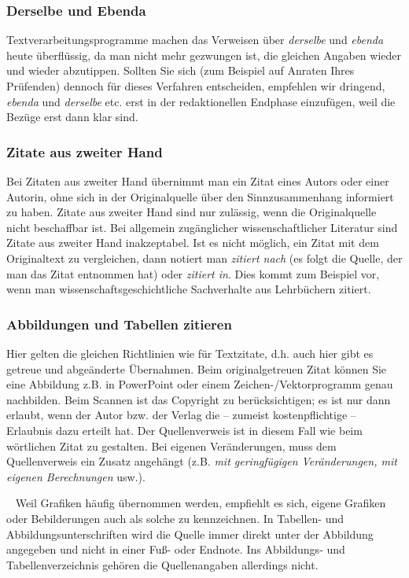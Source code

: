 \documentclass[a4paper,11pt]{article}%
\renewcommand{\\}{\vspace*{0.5\baselineskip} \newline}
\begin{document}
\subsubsection{Derselbe und Ebenda}
Textverarbeitungsprogramme machen das Verweisen über \textit{derselbe} und \textit{ebenda} heute überflüssig, da man nicht mehr gezwungen ist, die gleichen Angaben wieder und wieder abzutippen. Sollten Sie sich (zum Beispiel auf Anraten Ihres Prüfenden) dennoch für dieses Verfahren entscheiden, empfehlen wir dringend, \textit{ebenda} und \textit{derselbe} etc. erst in der redaktionellen Endphase einzufügen, weil die Bezüge erst dann klar sind. 

\subsubsection{Zitate aus zweiter Hand}
Bei Zitaten aus zweiter Hand übernimmt man ein Zitat eines Autors oder einer Autorin, ohne sich in der Originalquelle über den Sinnzusammenhang informiert zu haben. Zitate aus zweiter Hand sind nur zulässig, wenn die Originalquelle nicht beschaffbar ist. Bei allgemein zugänglicher wissenschaftlicher Literatur sind Zitate aus zweiter Hand inakzeptabel. Ist es nicht möglich, ein Zitat mit dem Originaltext zu vergleichen, dann notiert man \textit{zitiert nach} (es folgt die Quelle, der man das Zitat entnommen hat) oder \textit{zitiert in}. Dies kommt zum Beispiel vor, wenn man wissenschaftsgeschichtliche Sachverhalte aus Lehrbüchern zitiert.

\subsubsection{Abbildungen und Tabellen zitieren}
Hier gelten die gleichen Richtlinien wie für Textzitate, d.h. auch hier gibt es getreue und abgeänderte Übernahmen. Beim originalgetreuen Zitat können Sie eine Abbildung z.B. in PowerPoint oder einem Zeichen-/Vektorprogramm genau nachbilden. Beim Scannen ist das Copyright zu berücksichtigen; es ist nur dann erlaubt, wenn der Autor bzw. der Verlag die – zumeist kostenpflichtige – Erlaubnis dazu erteilt hat. Der Quellenverweis ist in diesem Fall wie beim wörtlichen Zitat zu gestalten. Bei eigenen Veränderungen, muss dem Quellenverweis ein Zusatz angehängt (z.B. \textit{mit geringfügigen Veränderungen, mit eigenen Berechnungen} usw.).

~\newline
Weil Grafiken häufig übernommen werden, empfiehlt es sich, eigene Grafiken oder Bebilderungen auch als solche zu kennzeichnen.\newline
In Tabellen- und Abbildungsunterschriften wird die Quelle immer direkt unter der Abbildung angegeben und nicht in einer Fuß- oder Endnote. Ins Abbildungs- und Tabellenverzeichnis gehören die Quellenangaben allerdings nicht.
\end{document}
